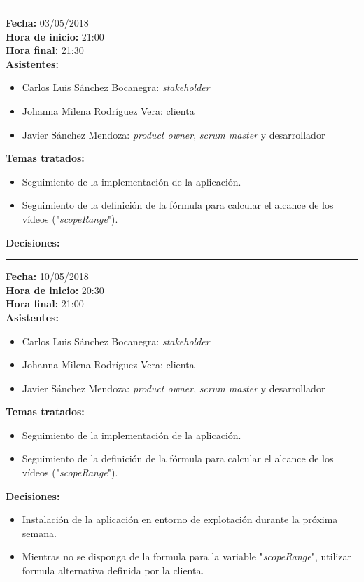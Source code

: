 \documentclass[11pt,a4paper]{article}
\begin{document}
\begin{center}\rule{10cm}{0.4pt}\end{center}

\noindent\textbf{Fecha:} 03/05/2018
\\
\noindent\textbf{Hora de inicio:} 21:00
\\
\noindent\textbf{Hora final:} 21:30
\\
\noindent\textbf{Asistentes:} 
\begin{itemize}
\item Carlos Luis Sánchez Bocanegra: \textit{stakeholder}
\item Johanna Milena Rodríguez Vera: clienta
\item Javier Sánchez Mendoza: \textit{product owner}, \textit{scrum master} y desarrollador
\end{itemize}
\noindent\textbf{Temas tratados:}
\begin{itemize}
\item Seguimiento de la implementación de la aplicación.
\item Seguimiento de la definición de la fórmula para calcular el alcance de los vídeos ("\textit{scopeRange}").
\end{itemize}
\noindent\textbf{Decisiones:}

\begin{center}\rule{10cm}{0.4pt}\end{center}

\noindent\textbf{Fecha:} 10/05/2018
\\
\noindent\textbf{Hora de inicio:} 20:30
\\
\noindent\textbf{Hora final:} 21:00
\\
\noindent\textbf{Asistentes:} 
\begin{itemize}
\item Carlos Luis Sánchez Bocanegra: \textit{stakeholder}
\item Johanna Milena Rodríguez Vera: clienta
\item Javier Sánchez Mendoza: \textit{product owner}, \textit{scrum master} y desarrollador
\end{itemize}
\noindent\textbf{Temas tratados:}
\begin{itemize}
\item Seguimiento de la implementación de la aplicación.
\item Seguimiento de la definición de la fórmula para calcular el alcance de los vídeos ("\textit{scopeRange}").
\end{itemize}
\noindent\textbf{Decisiones:}
\begin{itemize}
\item Instalación de la aplicación en entorno de explotación durante la próxima semana.
\item Mientras no se disponga de la formula para la variable "\textit{scopeRange}", utilizar formula alternativa definida por la clienta.
\end{itemize}
\end{document}
